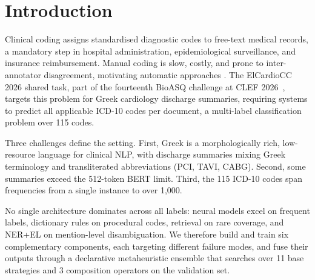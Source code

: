 \section{Introduction}
\label{sec:intro}

Clinical coding assigns standardised diagnostic codes to free-text medical records,
a mandatory step in hospital administration, epidemiological surveillance, and
insurance reimbursement. Manual coding is slow, costly, and prone to inter-annotator
disagreement, motivating automatic approaches \cite{dong2022automated}.
The ElCardioCC 2026 shared task, part of the fourteenth BioASQ challenge at CLEF
2026~\cite{BioASQ2026,BioASQ2026ElCardioCC}, targets this problem for Greek
cardiology discharge summaries, requiring systems to predict all applicable ICD-10 codes
per document, a multi-label classification problem over 115 codes.

Three challenges define the setting. First, Greek is a morphologically rich,
low-resource language for clinical NLP, with discharge summaries mixing Greek
terminology and transliterated abbreviations (PCI, TAVI, CABG). Second, some
summaries exceed the 512-token BERT limit. Third, the 115 ICD-10 codes span
frequencies from a single instance to over 1,000.

No single architecture dominates across all labels: neural models excel on frequent
labels, dictionary rules on procedural codes, retrieval on rare coverage, and NER+EL
on mention-level disambiguation. We therefore build and train six complementary
components, each targeting different failure modes, and fuse their outputs through a
declarative metaheuristic ensemble that searches over 11 base strategies and 3
composition operators on the validation set.
